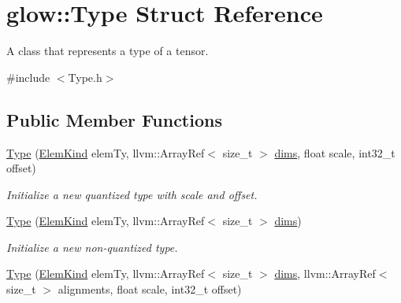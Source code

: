 \hypertarget{structglow_1_1_type}{}\section{glow\+:\+:Type Struct Reference}
\label{structglow_1_1_type}


A class that represents a type of a tensor.  




{\ttfamily \#include $<$Type.\+h$>$}

\subsection*{Public Member Functions}
\begin{DoxyCompactItemize}
\item 
\mbox{\label{structglow_1_1_type_ae78da9643c3ea3f7db82fd3ebc9a0cc7}} 
\hyperlink{structglow_1_1_type_ae78da9643c3ea3f7db82fd3ebc9a0cc7}{Type} (\hyperlink{namespaceglow_ab92e14a94329daf4083db670e95fbcdf}{Elem\+Kind} elem\+Ty, llvm\+::\+Array\+Ref$<$ size\+\_\+t $>$ \hyperlink{structglow_1_1_type_abf3890a5fdcd39b5c221a513a15c5461}{dims}, float scale, int32\+\_\+t offset)
\begin{DoxyCompactList}\small\item\em Initialize a new quantized type with {\ttfamily scale} and {\ttfamily offset}. \end{DoxyCompactList}\item 
\mbox{\label{structglow_1_1_type_a128506ce7e4533852994e9d5d766da5b}} 
\hyperlink{structglow_1_1_type_a128506ce7e4533852994e9d5d766da5b}{Type} (\hyperlink{namespaceglow_ab92e14a94329daf4083db670e95fbcdf}{Elem\+Kind} elem\+Ty, llvm\+::\+Array\+Ref$<$ size\+\_\+t $>$ \hyperlink{structglow_1_1_type_abf3890a5fdcd39b5c221a513a15c5461}{dims})
\begin{DoxyCompactList}\small\item\em Initialize a new non-\/quantized type. \end{DoxyCompactList}\item 
\mbox{\label{structglow_1_1_type_add9ac345f2aa3eb54f2d001ca55f29da}} 
\hyperlink{structglow_1_1_type_add9ac345f2aa3eb54f2d001ca55f29da}{Type} (\hyperlink{namespaceglow_ab92e14a94329daf4083db670e95fbcdf}{Elem\+Kind} elem\+Ty, llvm\+::\+Array\+Ref$<$ size\+\_\+t $>$ \hyperlink{structglow_1_1_type_abf3890a5fdcd39b5c221a513a15c5461}{dims}, llvm\+::\+Array\+Ref$<$ size\+\_\+t $>$ alignments, float scale, int32\+\_\+t offset)

\end{DoxyCompactItemize}
